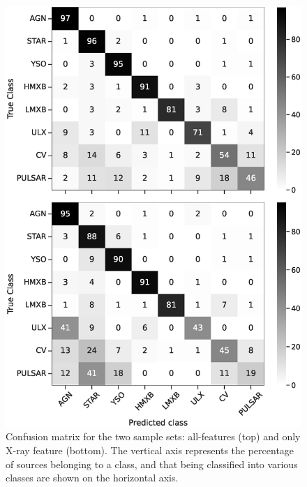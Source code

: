 \documentclass[fleqn,usenatbib]{mnras}
\begin{document}
    \begin{figure}
        \centering
        \includegraphics[width=\columnwidth]{images/cf_mw_comp_recall.eps}
        \caption{Confusion matrix for the two sample sets: all-features (top) and only X-ray feature (bottom). The vertical axis represents the percentage of sources belonging to a class, and that being classified into various classes are shown on the horizontal axis.}
        \label{fig:confusion-matrix}
    \end{figure}
    
\end{document}
